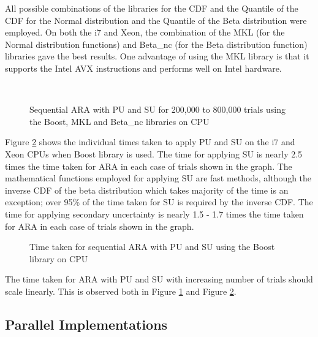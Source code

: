 All possible combinations of the libraries for the CDF and the Quantile of the CDF for the Normal distribution and the Quantile of the Beta distribution were employed. On both the i7 and Xeon, the combination of the MKL (for the Normal distribution functions) and Beta\_nc (for the Beta distribution function) libraries gave the best results. One advantage of using the MKL library is that it supports the Intel AVX instructions and performs well on Intel hardware.

\begin{figure} \centering
	 \\
\caption{Sequential ARA with PU and SU for 200,000 to 800,000 trials using the Boost, MKL and Beta\_nc libraries on CPU}
\label{figure1}
\end{figure}

Figure \ref{figure2} shows the individual times taken to apply PU and SU on the i7 and Xeon CPUs when Boost library is used. 
The time for applying SU is nearly 2.5 times the time taken for ARA in each case of trials shown in the graph. 
The mathematical functions employed for applying SU are fast methods, although the inverse CDF of the beta distribution which takes majority of the time is an exception; over 95\% of the time taken for SU is required by the inverse CDF. 
The time for applying secondary uncertainty is nearly 1.5 - 1.7 times the time taken for ARA in each case of trials shown in the graph. 

\begin{figure} \centering
	 \hspace{12pt}
\caption{Time taken for sequential ARA with PU and SU using the Boost library on CPU}
\label{figure2}
\end{figure}

The time taken for ARA with PU and SU with increasing number of trials should scale linearly. This is observed both in Figure \ref{figure1} and Figure \ref{figure2}. 



\subsection{Parallel Implementations}

